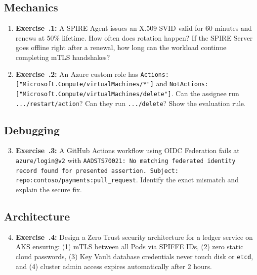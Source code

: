 \subsection{Mechanics}
\begin{enumerate}[leftmargin=18pt]
  \item \textbf{Exercise~\thechapter.1:} A SPIRE Agent issues an X.509-SVID valid for 60 minutes and renews at 50\% lifetime. How often does rotation happen? If the SPIRE Server goes offline right after a renewal, how long can the workload continue completing mTLS handshakes?
  \item \textbf{Exercise~\thechapter.2:} An Azure custom role has \texttt{Actions: ["Microsoft.Compute/virtualMachines/*"]} and \texttt{NotActions: ["Microsoft.Compute/virtualMachines/delete"]}. Can the assignee run \texttt{.../restart/action}? Can they run \texttt{.../delete}? Show the evaluation rule.
\end{enumerate}

\subsection{Debugging}
\begin{enumerate}[leftmargin=18pt]
  \setcounter{enumi}{2}
  \item \textbf{Exercise~\thechapter.3:} A GitHub Actions workflow using OIDC Federation fails at \texttt{azure/login@v2} with \texttt{AADSTS70021: No matching federated identity record found for presented assertion. Subject: repo:contoso/payments:pull\_request}. Identify the exact mismatch and explain the secure fix.
\end{enumerate}

\subsection{Architecture}
\begin{enumerate}[leftmargin=18pt]
  \setcounter{enumi}{3}
  \item \textbf{Exercise~\thechapter.4:} Design a Zero Trust security architecture for a ledger service on AKS ensuring: (1) mTLS between all Pods via SPIFFE IDs, (2) zero static cloud passwords, (3) Key Vault database credentials never touch disk or \texttt{etcd}, and (4) cluster admin access expires automatically after 2 hours.
\end{enumerate}

